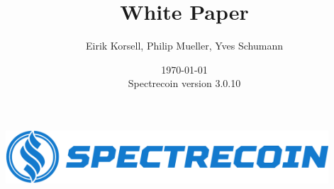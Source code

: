 \documentclass[a4paper,12pt]{article}
\title{White Paper}
\author{Eirik Korsell, Philip Mueller, Yves Schumann}
\date{\today \\
	Spectrecoin version 3.0.10}
\begin{document}
\begin{titlingpage} %
\begin{center}
\includegraphics[height=2cm]{Images/Headline.png}\\ %
\vspace{4cm} %
\begin{huge} 
\textbf{\thetitle} \\
\end{huge}
\theauthor\\
\vspace{7cm} %
\thedate
\end{center}
\end{titlingpage}

\sffamily

\begin{spacing}{1}
    \tableofcontents
\end{spacing}

\setlength{\arrayrulewidth}{.5mm}
\setlength{\tabcolsep}{8pt}
\renewcommand{\arraystretch}{1.5}
















\end{document}
